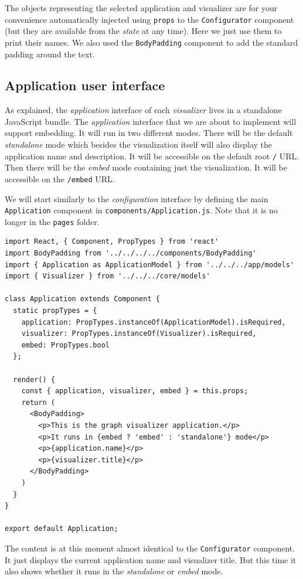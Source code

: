 The objects representing the selected application and visualizer are  for your convenience automatically injected using \texttt{props} to the \texttt{Configurator} component (but they are available from the \emph{state} at any time). Here we just use them to print their names. We also used the \texttt{BodyPadding} component to add the standard padding around the text.

\subsection{Application user interface}

As explained, the \emph{application} interface of each \emph{visualizer} lives in a standalone JavaScript bundle. The \emph{application} interface that we are about to implement will support embedding. It will run in two different modes. There will be the default \emph{standalone} mode which besides the visualization itself will also display the application name and description. It will be accessible on the default root \texttt{/} URL. Then there will be the \emph{embed} mode containing just the visualization. It will be accessible on the \texttt{/embed} URL.

We will start similarly to the \emph{configuration} interface by defining the main \texttt{Application} component in \texttt{components/Application.js}. Note that it is no longer in the \texttt{pages} folder.

\begin{verbatim}
import React, { Component, PropTypes } from 'react'
import BodyPadding from '../../../../components/BodyPadding'
import { Application as ApplicationModel } from '../../../app/models'
import { Visualizer } from '../../../core/models'

class Application extends Component {
  static propTypes = {
    application: PropTypes.instanceOf(ApplicationModel).isRequired,
    visualizer: PropTypes.instanceOf(Visualizer).isRequired,
    embed: PropTypes.bool
  };

  render() {
    const { application, visualizer, embed } = this.props;
    return (
      <BodyPadding>
        <p>This is the graph visualizer application.</p>
        <p>It runs in {embed ? 'embed' : 'standalone'} mode</p>
        <p>{application.name}</p>
        <p>{visualizer.title}</p>
      </BodyPadding>
    )
  }
}

export default Application;
\end{verbatim}

The content is at this moment almost identical to the \texttt{Configurator} component. It just displays the current application name and visualizer title. But this time it also shows whether it runs in the \emph{standalone} or \emph{embed} mode. 

